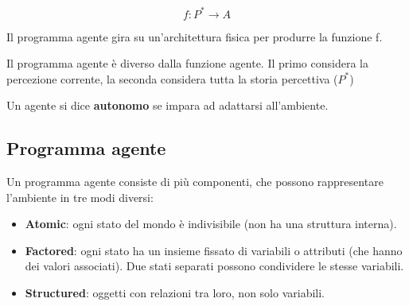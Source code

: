 \begin{equation}
f: P^* \rightarrow A
\end{equation}

Il programma agente gira su un'architettura fisica per produrre la funzione f.

Il programma agente è diverso dalla funzione agente. Il primo considera la
percezione corrente, la seconda considera tutta la storia percettiva ($P^*$)

Un agente si dice \textbf{autonomo} se impara ad adattarsi all'ambiente.

\subsection{Programma agente}

Un programma agente consiste di più componenti, che possono rappresentare
l'ambiente in tre modi diversi:

\begin{itemize}
 \item \textbf{Atomic}: ogni stato del mondo è indivisibile (non ha una
struttura interna).
 \item \textbf{Factored}: ogni stato ha un insieme fissato di variabili o
attributi (che hanno dei valori associati).
Due stati separati possono condividere le stesse variabili.
 \item \textbf{Structured}: oggetti con relazioni tra loro, non solo
variabili.
\end{itemize}
